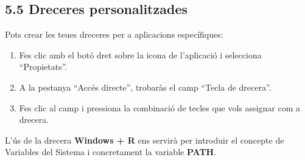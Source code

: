 \documentclass[
  a4paper,
]{article}
\providecommand{\tightlist}{%
  \setlength{\itemsep}{0pt}\setlength{\parskip}{0pt}}
\begin{document}
\subsection{5.5 Dreceres
personalitzades}\label{dreceres-personalitzades}

Pots crear les teues dreceres per a aplicacions específiques:

\begin{enumerate}
\def\labelenumi{\arabic{enumi}.}
\tightlist
\item
  Fes clic amb el botó dret sobre la icona de l'aplicació i selecciona
  ``Propietats''.
\item
  A la pestanya ``Accés directe'', trobaràs el camp ``Tecla de
  drecera''.
\item
  Fes clic al camp i pressiona la combinació de tecles que vols assignar
  com a drecera.
\end{enumerate}

L'ús de la drecera \textbf{Windows + R} ens servirà per introduir el
concepte de Variables del Sistema i concretament la variable
\textbf{PATH}.
\end{document}
